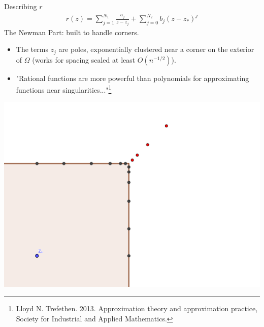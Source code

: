 \documentclass{seminar}
\begin{document}
\begin{slide} %
\large Describing $r$ 
\small
\begin{align*}
r(z)= \sum_{j=1}^{N_1} \frac{a_j}{z-z_j} + \sum_{j=0}^{N_2} b_j (z-z_*)^j
\end{align*}
The Newman Part: built to handle corners.

\begin{multicols}{2}
\begin{itemize}
	\item The terms $z_j$ are poles, exponentially clustered near a corner on the exterior of $\Omega$ (works for spacing scaled at least $O(n^{-1/2})$).
	\item "Rational functions are more powerful than polynomials for approximating functions near singularities..."\footnote{Lloyd N. Trefethen. 2013. Approximation theory and approximation practice, Society for Industrial and Applied Mathematics.}
\end{itemize}
\includegraphics[scale=4]{./PNG/corner_nodes_illust}
\end{multicols}
\end{slide} %
\end{document}
